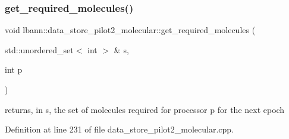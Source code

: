 \subsubsection{\texorpdfstring{get\+\_\+required\+\_\+molecules()}{get\_required\_molecules()}}
{\footnotesize\ttfamily void lbann\+::data\+\_\+store\+\_\+pilot2\+\_\+molecular\+::get\+\_\+required\+\_\+molecules (\begin{DoxyParamCaption}\item[{std\+::unordered\+\_\+set$<$ int $>$ \&}]{s,  }\item[{int}]{p }\end{DoxyParamCaption})\hspace{0.3cm}{\ttfamily [protected]}}

returns, in \textquotesingle{}s,\textquotesingle{} the set of molecules required for processor \textquotesingle{}p\textquotesingle{} for the next epoch 

Definition at line 231 of file data\+\_\+store\+\_\+pilot2\+\_\+molecular.\+cpp.


